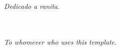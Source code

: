 {
    \raggedleft
    \emph{Dedicado a ranita.}


    \ \\
    \ \\

    \emph{To whomever who uses this template.}
    
}